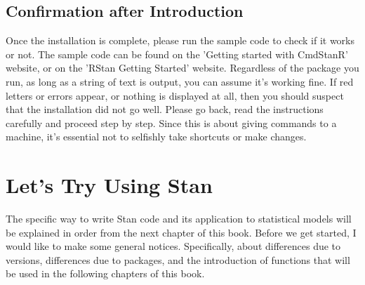\documentclass{ltjsbook}
\begin{document}
\subsection{Confirmation after Introduction}
Once the installation is complete, please run the sample code to check if it works or not. The sample code can be found on the 'Getting started with CmdStanR' website, or on the 'RStan Getting Started' website.
Regardless of the package you run, as long as a string of text is output, you can assume it's working fine. If red letters or errors appear, or nothing is displayed at all, then you should suspect that the installation did not go well. Please go back, read the instructions carefully and proceed step by step. Since this is about giving commands to a machine, it's essential not to selfishly take shortcuts or make changes.
\section{Let's Try Using Stan}
The specific way to write Stan code and its application to statistical models will be explained in order from the next chapter of this book.
Before we get started, I would like to make some general notices. Specifically, about differences due to versions, differences due to packages, and the introduction of functions that will be used in the following chapters of this book.
\end{document}
